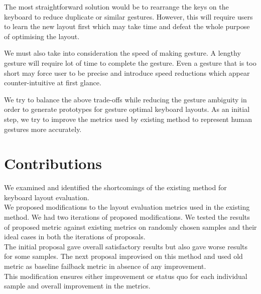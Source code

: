\documentclass[MTech]{iitmdiss}
\begin{document}
The most straightforward solution would be to rearrange the keys on the keyboard to reduce duplicate or similar gestures. However, this will require users to learn the new layout first which may take time and defeat the whole purpose of optimising the layout.


We must also take into consideration the speed of making gesture. A lengthy gesture will require lot of time to complete the gesture. Even a gesture that is too short may force user to be precise and introduce speed reductions which appear counter-intuitive at first glance.


We try to balance the above trade-offs while reducing the gesture ambiguity in order to generate prototypes for gesture optimal keyboard layouts. As an initial step, we try to improve the metrics used by existing method to represent human gestures more accurately.

\section{Contributions}
We examined and identified the shortcomings of the existing method for keyboard layout evaluation.\\
We proposed modifications to the layout evaluation metrics used in the existing method. We had two iterations of proposed modifications. We tested the results of proposed metric against existing metrics on randomly chosen samples and their ideal cases in both the iterations of proposals.\\ 
The initial proposal gave overall satisfactory results but also gave worse results for some samples. The next proposal improvised on this method and used old metric as baseline failback metric in absence of any improvement.\\
This modification ensures either improvement or status quo for each individual sample and overall improvement in the metrics. 
\end{document}
